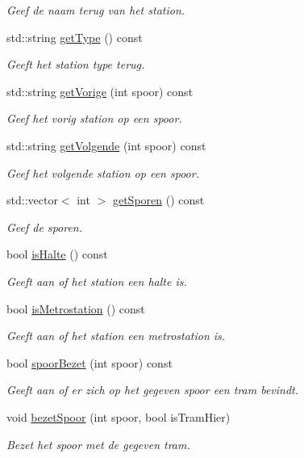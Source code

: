 \begin{DoxyCompactItemize}
\begin{DoxyCompactList}\small\item\em Geef de naam terug van het station. \end{DoxyCompactList}\item 
std\+::string \hyperlink{class_station_a3868695486e4f95ec5c3d426bd270773}{get\+Type} () const 
\begin{DoxyCompactList}\small\item\em Geeft het station type terug. \end{DoxyCompactList}\item 
std\+::string \hyperlink{class_station_a054c18147669814c9c3206419ec6d8cc}{get\+Vorige} (int spoor) const 
\begin{DoxyCompactList}\small\item\em Geef het vorig station op een spoor. \end{DoxyCompactList}\item 
std\+::string \hyperlink{class_station_a950a03b6e82abe53c0bbc10542e4cdee}{get\+Volgende} (int spoor) const 
\begin{DoxyCompactList}\small\item\em Geef het volgende station op een spoor. \end{DoxyCompactList}\item 
std\+::vector$<$ int $>$ \hyperlink{class_station_abec3576133446a9f1699b7778f07ada9}{get\+Sporen} () const 
\begin{DoxyCompactList}\small\item\em Geef de sporen. \end{DoxyCompactList}\item 
bool \hyperlink{class_station_a8a258a9759b3637fb17fb8b008b5db81}{is\+Halte} () const 
\begin{DoxyCompactList}\small\item\em Geeft aan of het station een halte is. \end{DoxyCompactList}\item 
bool \hyperlink{class_station_a79ecb699d3cfbd1e450f6a4b72b6034e}{is\+Metrostation} () const 
\begin{DoxyCompactList}\small\item\em Geeft aan of het station een metrostation is. \end{DoxyCompactList}\item 
bool \hyperlink{class_station_ab8a40b1e5d3b6228a3a173dd0140a5fb}{spoor\+Bezet} (int spoor) const 
\begin{DoxyCompactList}\small\item\em Geeft aan of er zich op het gegeven spoor een tram bevindt. \end{DoxyCompactList}\item 
void \hyperlink{class_station_ac13697fedd84f3d1c29d6c61b5ae97b3}{bezet\+Spoor} (int spoor, bool is\+Tram\+Hier)
\begin{DoxyCompactList}\small\item\em Bezet het spoor met de gegeven tram. \end{DoxyCompactList}\end{DoxyCompactItemize}


